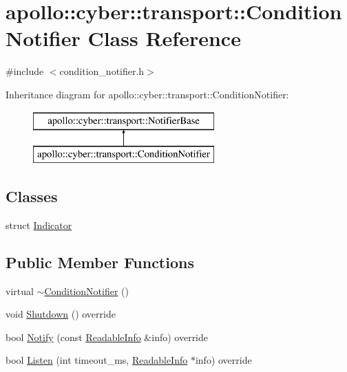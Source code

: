 \hypertarget{classapollo_1_1cyber_1_1transport_1_1ConditionNotifier}{\section{apollo\-:\-:cyber\-:\-:transport\-:\-:Condition\-Notifier Class Reference}
\label{classapollo_1_1cyber_1_1transport_1_1ConditionNotifier}
}


{\ttfamily \#include $<$condition\-\_\-notifier.\-h$>$}

Inheritance diagram for apollo\-:\-:cyber\-:\-:transport\-:\-:Condition\-Notifier\-:\begin{figure}[H]
\begin{center}
\leavevmode
\includegraphics[height=2.000000cm]{classapollo_1_1cyber_1_1transport_1_1ConditionNotifier}
\end{center}
\end{figure}
\subsection*{Classes}
\begin{DoxyCompactItemize}
\item 
struct \hyperlink{structapollo_1_1cyber_1_1transport_1_1ConditionNotifier_1_1Indicator}{Indicator}
\end{DoxyCompactItemize}
\subsection*{Public Member Functions}
\begin{DoxyCompactItemize}
\item 
virtual \hyperlink{classapollo_1_1cyber_1_1transport_1_1ConditionNotifier_a7e4bd95c4da5a8d1e6194c255ee75eb3}{$\sim$\-Condition\-Notifier} ()
\item 
void \hyperlink{classapollo_1_1cyber_1_1transport_1_1ConditionNotifier_a057d3f71a69a9913107416166a01a81b}{Shutdown} () override
\item 
bool \hyperlink{classapollo_1_1cyber_1_1transport_1_1ConditionNotifier_ad9d938243de75dc7b015ca2ca9819f01}{Notify} (const \hyperlink{classapollo_1_1cyber_1_1transport_1_1ReadableInfo}{Readable\-Info} \&info) override
\item 
bool \hyperlink{classapollo_1_1cyber_1_1transport_1_1ConditionNotifier_a961bd6d94fdae4ffa6a7413a95932db5}{Listen} (int timeout\-\_\-ms, \hyperlink{classapollo_1_1cyber_1_1transport_1_1ReadableInfo}{Readable\-Info} $\ast$info) override
\end{DoxyCompactItemize}
